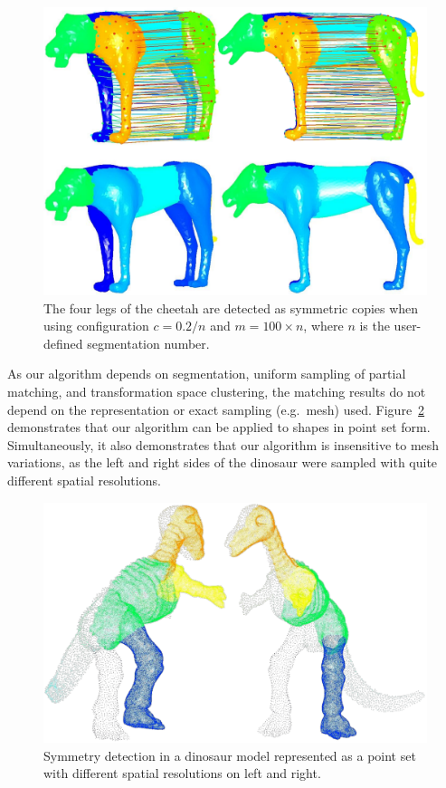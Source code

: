 \begin{figure}[t]
\centering
  \includegraphics[width=0.99\linewidth]{figures/chetah.pdf}
  \caption{The four legs of the cheetah are detected as symmetric copies when using configuration $c=0.2/n$ and $m=100 \times n$, where $n$ is the user-defined segmentation number.
}
\label{fig:Tiger}
\end{figure}

As our algorithm depends on segmentation, uniform sampling of partial matching,
and transformation space clustering, the matching results do not depend on the representation or exact sampling (e.g.\ mesh) used.
Figure~\ref{fig:Point} demonstrates that our algorithm can be applied to shapes in  point set form.
Simultaneously, it also demonstrates that our algorithm is insensitive to  mesh variations, as the left and right sides of the dinosaur were sampled with quite different spatial resolutions.

\begin{figure}[t]
\centering
  \includegraphics[width=0.99\linewidth]{figures/dinosaur.pdf}
  \caption{Symmetry detection in a dinosaur model represented as a point set with  different spatial resolutions on  left and right.}
\label{fig:Point}
\end{figure}

